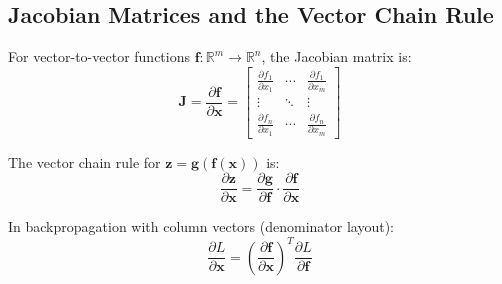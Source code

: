 \begin{notechapter}
\section{Jacobian Matrices and the Vector Chain Rule}

For vector-to-vector functions $\mathbf{f}: \mathbb{R}^m \to \mathbb{R}^n$, the Jacobian matrix is:
$$\mathbf{J} = \frac{\partial \mathbf{f}}{\partial \mathbf{x}} = \begin{bmatrix}
\frac{\partial f_1}{\partial x_1} & \cdots & \frac{\partial f_1}{\partial x_m} \\
\vdots & \ddots & \vdots \\
\frac{\partial f_n}{\partial x_1} & \cdots & \frac{\partial f_n}{\partial x_m}
\end{bmatrix}$$

The vector chain rule for $\mathbf{z} = \mathbf{g}(\mathbf{f}(\mathbf{x}))$ is:
$$\frac{\partial \mathbf{z}}{\partial \mathbf{x}} = \frac{\partial \mathbf{g}}{\partial \mathbf{f}} \cdot \frac{\partial \mathbf{f}}{\partial \mathbf{x}}$$

In backpropagation with column vectors (denominator layout):
$$\frac{\partial L}{\partial \mathbf{x}} = \left(\frac{\partial \mathbf{f}}{\partial \mathbf{x}}\right)^T \frac{\partial L}{\partial \mathbf{f}}$$
\end{notechapter}
